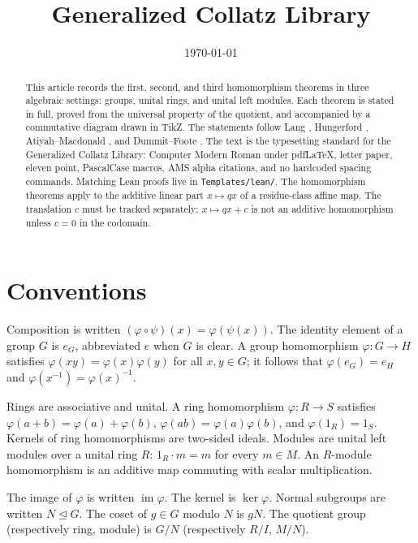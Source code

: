 \documentclass[11pt,letterpaper]{article}
\title{Generalized Collatz Library}
\author{}
\date{\today}
\newcommand{\Map}[3]{#1 \colon #2 \to #3}
\begin{document}
\maketitle

\begin{abstract}
This article records the first, second, and third homomorphism theorems in three algebraic settings: groups, unital rings, and unital left modules. Each theorem is stated in full, proved from the universal property of the quotient, and accompanied by a commutative diagram drawn in TikZ. The statements follow Lang \cite{Lang02}, Hungerford \cite{Hungerford74}, Atiyah--Macdonald \cite{AtiyahMacdonald69}, and Dummit--Foote \cite{DummitFoote04}. The text is the typesetting standard for the Generalized Collatz Library: Computer Modern Roman under pdfLaTeX, letter paper, eleven point, PascalCase macros, AMS alpha citations, and no hardcoded spacing commands. Matching Lean proofs live in \texttt{Templates/lean/}. The homomorphism theorems apply to the additive linear part \(x\mapsto qx\) of a residue-class affine map. The translation \(c\) must be tracked separately: \(x\mapsto qx+c\) is not an additive homomorphism unless \(c=0\) in the codomain.
\end{abstract}

\section{Conventions}

Composition is written \((\varphi\circ\psi)(x)=\varphi(\psi(x))\). The identity element of a group \(G\) is \(e_G\), abbreviated \(e\) when \(G\) is clear. A group homomorphism \(\Map{\varphi}{G}{H}\) satisfies \(\varphi(xy)=\varphi(x)\varphi(y)\) for all \(x,y\in G\); it follows that \(\varphi(e_G)=e_H\) and \(\varphi(x^{-1})=\varphi(x)^{-1}\).

Rings are associative and unital. A ring homomorphism \(\Map{\varphi}{R}{S}\) satisfies \(\varphi(a+b)=\varphi(a)+\varphi(b)\), \(\varphi(ab)=\varphi(a)\varphi(b)\), and \(\varphi(1_R)=1_S\). Kernels of ring homomorphisms are two-sided ideals. Modules are unital left modules over a unital ring \(R\): \(1_R\cdot m=m\) for every \(m\in M\). An \(R\)-module homomorphism is an additive map commuting with scalar multiplication.

The image of \(\varphi\) is written \(\operatorname{im}\varphi\). The kernel is \(\ker\varphi\). Normal subgroups are written \(N\trianglelefteq G\). The coset of \(g\in G\) modulo \(N\) is \(gN\). The quotient group (respectively ring, module) is \(G/N\) (respectively \(R/I\), \(M/N\)).
\end{document}
